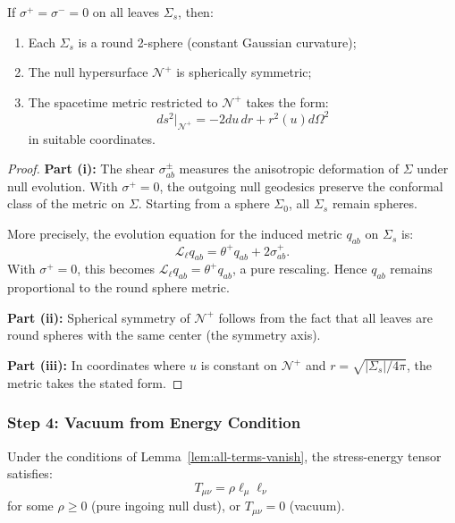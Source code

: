 \begin{lemma}
\label{lem:spherical-symmetry}
If $\sigma^+ = \sigma^- = 0$ on all leaves $\Sigma_s$, then:
\begin{enumerate}[label=(\roman*)]
\item Each $\Sigma_s$ is a round 2-sphere (constant Gaussian curvature);
\item The null hypersurface $\mathcal{N}^+$ is spherically symmetric;
\item The spacetime metric restricted to $\mathcal{N}^+$ takes the form:
\begin{equation}
ds^2|_{\mathcal{N}^+} = -2 du \, dr + r^2(u) d\Omega^2
\end{equation}
in suitable coordinates.
\end{enumerate}
\end{lemma}

\begin{proof}
\textbf{Part (i):} The shear $\sigma^\pm_{ab}$ measures the anisotropic deformation of $\Sigma$ under null evolution. With $\sigma^+ = 0$, the outgoing null geodesics preserve the conformal class of the metric on $\Sigma$. Starting from a sphere $\Sigma_0$, all $\Sigma_s$ remain spheres.

More precisely, the evolution equation for the induced metric $q_{ab}$ on $\Sigma_s$ is:
\begin{equation}
\mathcal{L}_\ell q_{ab} = \theta^+ q_{ab} + 2\sigma^+_{ab}.
\end{equation}
With $\sigma^+ = 0$, this becomes $\mathcal{L}_\ell q_{ab} = \theta^+ q_{ab}$, a pure rescaling. Hence $q_{ab}$ remains proportional to the round sphere metric.

\textbf{Part (ii):} Spherical symmetry of $\mathcal{N}^+$ follows from the fact that all leaves are round spheres with the same center (the symmetry axis).

\textbf{Part (iii):} In coordinates where $u$ is constant on $\mathcal{N}^+$ and $r = \sqrt{|\Sigma_s|/4\pi}$, the metric takes the stated form.
\end{proof}

\subsubsection{Step 4: Vacuum from Energy Condition}

\begin{lemma}
\label{lem:vacuum}
Under the conditions of Lemma~\ref{lem:all-terms-vanish}, the stress-energy tensor satisfies:
\begin{equation}
T_{\mu\nu} = \rho \ell_\mu \ell_\nu
\end{equation}
for some $\rho \geq 0$ (pure ingoing null dust), or $T_{\mu\nu} = 0$ (vacuum).
\end{lemma}

